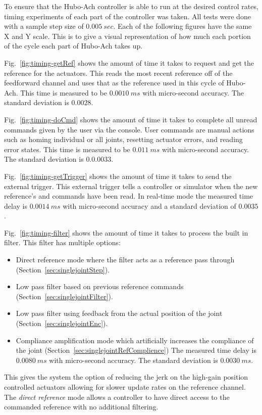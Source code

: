 
To ensure that the Hubo-Ach controller is able to run at the desired control rates, timing experiments of each part of the controller was taken.
All tests were done with a sample step size of $0.005~sec$.
Each of the following figures have the same X and Y scale.
This is to give a visual representation of how much each portion of the cycle each part of Hubo-Ach takes up.




Fig.~\ref{fig:timing-getRef} shows the amount of time it takes to request and get the reference for the actuators.
This reads the most recent reference off of the feedforward channel and uses that as the reference used in this cycle of Hubo-Ach.
This time is measured to be $0.0010~ms$ with micro-second accuracy.
The standard deviation is $0.0028$.



Fig.~\ref{fig:timing-doCmd} shows the amount of time it takes to complete all unread commands given by the user via the console.
User commands are manual actions such as homing individual or all joints, resetting actuator errors, and reading error states.
This time is measured to be $0.011~ms$ with micro-second accuracy.
The standard deviation is $0.0.0033$.


Fig.~\ref{fig:timing-getTrigger} shows the amount of time it takes to send the external trigger.  
This external trigger tells a controller or simulator when the new reference's and commands have been read.
In real-time mode the measured time delay is $0.0014~ms$ with micro-second accuracy and a standard deviation of $0.0035$.


Fig.~\ref{fig:timing-filter} shows the amount of time it takes to process the built in filter.
This filter has multiple options:
\begin{itemize}
\item Direct reference mode where the filter acts as a reference pass through (Section~\ref{sec:singlejointStep}).
\item Low pass filter based on previous reference commands (Section~\ref{sec:singlejointFilter}).
\item Low pass filter using feedback from the actual position of the joint (Section~\ref{sec:singlejointEnc}).
\item Compliance amplification mode which artificially increases the compliance of the joint (Section~\ref{sec:singlejointRefComplience})
The measured time delay is $0.0080~ms$ with micro-second accuracy.
The standard deviation is $0.0030~ms$.
\end{itemize}
This gives the system the option of reducing the jerk on the high-gain position controlled actuators allowing for slower update rates on the reference channel.
The \textit{direct reference} mode allows a controller to have direct access to the commanded reference with no additional filtering.





